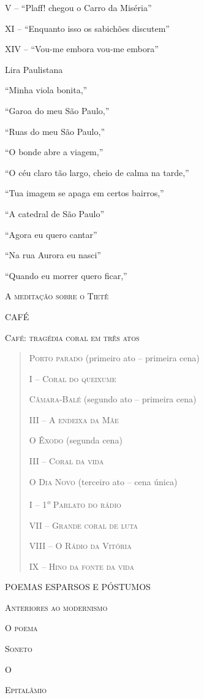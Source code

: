 V -- ``Plaff! chegou o Carro da Miséria''

XI -- ``Enquanto isso os sabichões discutem''

XIV -- ``Vou-me embora vou-me embora''

Lira Paulistana

``Minha viola bonita,''

``Garoa do meu São Paulo,''

``Ruas do meu São Paulo,''

``O bonde abre a viagem,''

``O céu claro tão largo, cheio de calma na tarde,''

``Tua imagem se apaga em certos bairros,''

``A catedral de São Paulo''

``Agora eu quero cantar''

``Na rua Aurora eu nasci''

``Quando eu morrer quero ficar,''

\textsc{A meditação sobre o Tietê}

CAFÉ

\textsc{Café: tragédia coral em três atos}

\begin{quote}
\textsc{Porto parado} (primeiro ato -- primeira cena)

\textsc{I -- Coral do queixume}

\textsc{Câmara-Balé} (segundo ato -- primeira cena)

\textsc{III -- A endeixa da Mãe }

\textsc{O Êxodo} (segunda cena)

\textsc{III -- Coral da vida }

\textsc{O Dia Novo} (terceiro ato -- cena única)

\textsc{I -- 1}\textsuperscript{\emph{o}} \textsc{Parlato do rádio}

\textsc{VII -- Grande coral de luta}

\textsc{VIII -- O Rádio da Vitória}

\textsc{IX -- Hino da fonte da vida}
\end{quote}

POEMAS ESPARSOS E PÓSTUMOS

\textsc{Anteriores ao modernismo}

\textsc{O poema}

\textsc{Soneto}

\textsc{O }

\textsc{Epitalâmio}

